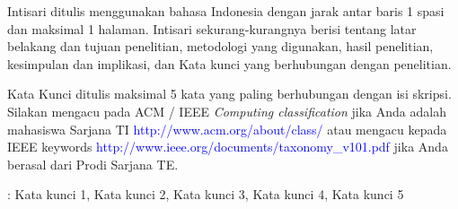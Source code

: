 Intisari ditulis menggunakan bahasa Indonesia dengan jarak antar baris 1 spasi dan maksimal 1 halaman. Intisari sekurang-kurangnya berisi tentang latar belakang dan tujuan penelitian, metodologi yang digunakan, hasil penelitian, kesimpulan dan implikasi, dan Kata kunci yang berhubungan dengan penelitian.

Kata Kunci ditulis maksimal 5 kata yang paling berhubungan dengan isi skripsi. Silakan mengacu pada ACM / IEEE \textit{Computing classification} jika Anda adalah mahasiswa Sarjana TI \textcolor{blue}{http://www.acm.org/about/class/} atau mengacu kepada IEEE keywords \textcolor{blue}{http://www.ieee.org/documents/taxonomy\_v101.pdf} jika Anda berasal dari Prodi Sarjana TE.

 : Kata kunci 1, Kata kunci 2, Kata kunci 3, Kata kunci 4, Kata kunci 5